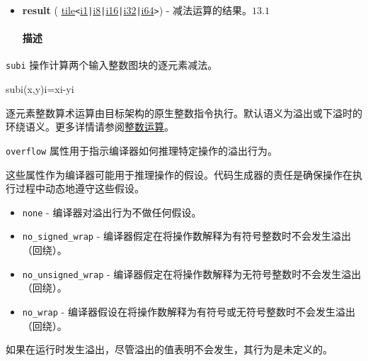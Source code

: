 \documentclass{article}
\begin{document}
\begin{itemize}
\item \textbf{result} ( \href{https://docs.nvidia.com/cuda/tile-ir/latest/sections/types.html#type-tile}{tile}\texttt{<}\href{https://docs.nvidia.com/cuda/tile-ir/latest/sections/types.html#subsection-element-types}{i1}\texttt{|}\href{https://docs.nvidia.com/cuda/tile-ir/latest/sections/types.html#subsection-element-types}{i8}\texttt{|}\href{https://docs.nvidia.com/cuda/tile-ir/latest/sections/types.html#subsection-element-types}{i16}\texttt{|}\href{https://docs.nvidia.com/cuda/tile-ir/latest/sections/types.html#subsection-element-types}{i32}\texttt{|}\href{https://docs.nvidia.com/cuda/tile-ir/latest/sections/types.html#subsection-element-types}{i64}\texttt{>}) - 减法运算的结果。$\boxed{13.1}$




\paragraph{描述}


\end{itemize}
\texttt{subi} 操作计算两个输入整数图块的逐元素减法。



subi(x,y)i=xi-yi


逐元素整数算术运算由目标架构的原生整数指令执行。默认语义为溢出或下溢时的环绕语义。更多详情请参阅\href{https://docs.nvidia.com/cuda/tile-ir/latest/sections/operations.html#op-group-integer}{整数运算}。



\texttt{overflow} 属性用于指示编译器如何推理特定操作的溢出行为。



这些属性作为编译器可能用于推理操作的假设。代码生成器的责任是确保操作在执行过程中动态地遵守这些假设。



\begin{itemize}
\item \texttt{none} - 编译器对溢出行为不做任何假设。
\item \texttt{no\_signed\_wrap} - 编译器假定在将操作数解释为有符号整数时不会发生溢出（回绕）。
\item \texttt{no\_unsigned\_wrap} - 编译器假定在将操作数解释为无符号整数时不会发生溢出（回绕）。
\item \texttt{no\_wrap} - 编译器假设在将操作数解释为有符号或无符号整数时不会发生溢出（回绕）。


\end{itemize}
如果在运行时发生溢出，尽管溢出的值表明不会发生，其行为是未定义的。
\end{document}
